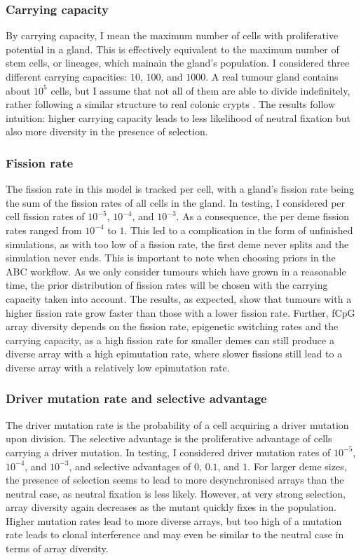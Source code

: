 \subsubsection{Carrying capacity}
By carrying capacity, I mean the maximum number of cells with proliferative
potential in a gland. This is effectively equivalent to the maximum number of
stem cells, or lineages, which mainain the gland's population. I considered
three different carrying capacities: $10$, $100$, and $1000$. A real tumour
gland contains about $10^5$ cells, but I assume that not all of them are able
to divide indefinitely, rather following a similar structure to real colonic
crypts \cite{cernat_colorectal_2014}. The results follow intuition: higher
carrying capacity leads to less likelihood of neutral fixation but also more
diversity in the presence of selection.

\subsubsection{Fission rate}
The fission rate in this model is tracked per cell, with a gland's fission rate
being the sum of the fission rates of all cells in the gland. In testing, I
considered per cell fission rates of $10^{-5}$, $10^{-4}$, and $10^{-3}$. As a
consequence, the per deme fission rates ranged from $10^{-4}$ to $1$. This led
to a complication in the form of unfinished simulations, as with too low of a
fission rate, the first deme never splits and the simulation never ends. This
is important to note when choosing priors in the ABC workflow. As we only
consider tumours which have grown in a reasonable time, the prior distribution
of fission rates will be chosen with the carrying capacity taken into account.
The results, as expected, show that tumours with a higher fission rate grow
faster than those with a lower fission rate. Further, fCpG array diversity
depends on the fission rate, epigenetic switching rates and the carrying
capacity, as a high fission rate for smaller demes can still produce a diverse
array with a high epimutation rate, where slower fissions still lead to a
diverse array with a relatively low epimutation rate.

\subsubsection{Driver mutation rate and selective advantage}
The driver mutation rate is the probability of a cell acquiring a driver
mutation upon division. The selective advantage is the proliferative advantage
of cells carrying a driver mutation. In testing, I considered driver mutation
rates of $10^{-5}$, $10^{-4}$, and $10^{-3}$, and selective advantages of $0$,
$0.1$, and $1$. For larger deme sizes, the presence of selection seems to lead
to more desynchronised arrays than the neutral case, as neutral fixation is
less likely. However, at very strong selection, array diversity again decreases
as the mutant quickly fixes in the population. Higher mutation rates lead to
more diverse arrays, but too high of a mutation rate leads to clonal
interference and may even be similar to the neutral case in terms of array
diversity.


